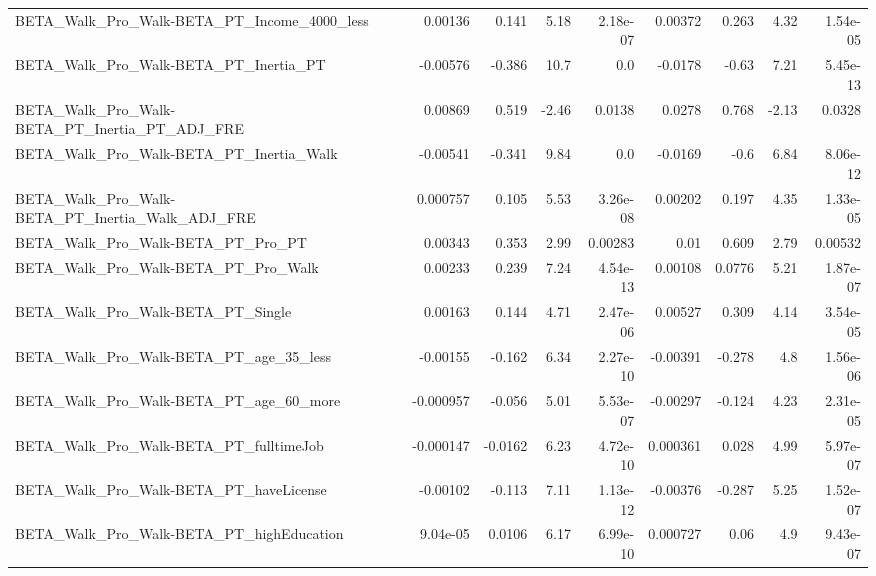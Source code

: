 \begin{tabular}{lrrrrrrrr}
BETA\_Walk\_Pro\_Walk-BETA\_PT\_Income\_4000\_less        &     0.00136 &        0.141 &     5.18 & 2.18e-07 &    0.00372 &       0.263 &         4.32 &      1.54e-05 \\
BETA\_Walk\_Pro\_Walk-BETA\_PT\_Inertia\_PT              &    -0.00576 &       -0.386 &     10.7 &      0.0 &    -0.0178 &       -0.63 &         7.21 &      5.45e-13 \\
BETA\_Walk\_Pro\_Walk-BETA\_PT\_Inertia\_PT\_ADJ\_FRE      &     0.00869 &        0.519 &    -2.46 &   0.0138 &     0.0278 &       0.768 &        -2.13 &        0.0328 \\
BETA\_Walk\_Pro\_Walk-BETA\_PT\_Inertia\_Walk            &    -0.00541 &       -0.341 &     9.84 &      0.0 &    -0.0169 &        -0.6 &         6.84 &      8.06e-12 \\
BETA\_Walk\_Pro\_Walk-BETA\_PT\_Inertia\_Walk\_ADJ\_FRE    &    0.000757 &        0.105 &     5.53 & 3.26e-08 &    0.00202 &       0.197 &         4.35 &      1.33e-05 \\
BETA\_Walk\_Pro\_Walk-BETA\_PT\_Pro\_PT                  &     0.00343 &        0.353 &     2.99 &  0.00283 &       0.01 &       0.609 &         2.79 &       0.00532 \\
BETA\_Walk\_Pro\_Walk-BETA\_PT\_Pro\_Walk                &     0.00233 &        0.239 &     7.24 & 4.54e-13 &    0.00108 &      0.0776 &         5.21 &      1.87e-07 \\
BETA\_Walk\_Pro\_Walk-BETA\_PT\_Single                  &     0.00163 &        0.144 &     4.71 & 2.47e-06 &    0.00527 &       0.309 &         4.14 &      3.54e-05 \\
BETA\_Walk\_Pro\_Walk-BETA\_PT\_age\_35\_less             &    -0.00155 &       -0.162 &     6.34 & 2.27e-10 &   -0.00391 &      -0.278 &          4.8 &      1.56e-06 \\
BETA\_Walk\_Pro\_Walk-BETA\_PT\_age\_60\_more             &   -0.000957 &       -0.056 &     5.01 & 5.53e-07 &   -0.00297 &      -0.124 &         4.23 &      2.31e-05 \\
BETA\_Walk\_Pro\_Walk-BETA\_PT\_fulltimeJob             &   -0.000147 &      -0.0162 &     6.23 & 4.72e-10 &   0.000361 &       0.028 &         4.99 &      5.97e-07 \\
BETA\_Walk\_Pro\_Walk-BETA\_PT\_haveLicense             &    -0.00102 &       -0.113 &     7.11 & 1.13e-12 &   -0.00376 &      -0.287 &         5.25 &      1.52e-07 \\
BETA\_Walk\_Pro\_Walk-BETA\_PT\_highEducation           &    9.04e-05 &       0.0106 &     6.17 & 6.99e-10 &   0.000727 &        0.06 &          4.9 &      9.43e-07 \\

\end{tabular}
